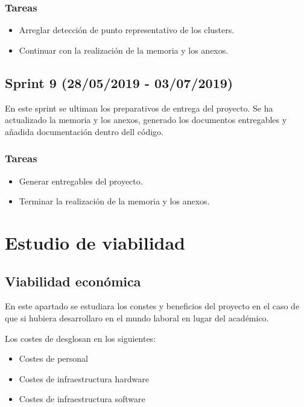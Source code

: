 \subsubsection{Tareas}
\begin{itemize}
\item Arreglar detección de punto representativo de los clusters.
\item Continuar con la realización de la memoria y los anexos.


\end{itemize}


\subsection{Sprint 9 (28/05/2019 - 03/07/2019)}
En este sprint se ultiman los preparativos de entrega del proyecto. Se ha actualizado la memoria y los anexos, generado los documentos entregables y añadida documentación dentro dell código.



\subsubsection{Tareas}
\begin{itemize}
\item Generar entregables del proyecto.
\item Terminar la realización de la memoria y los anexos.


\end{itemize}



\section{Estudio de viabilidad}



\subsection{Viabilidad económica}

En este apartado se estudiara los constes y beneficios del proyecto en el caso de que si hubiera desarrollaro en el mundo laboral en lugar del académico.

Los costes de desglosan en los siguientes: \\
\begin{itemize}
\item Costes de personal
\item Costes de infraestructura hardware
\item Costes de infraestructura software
\end{itemize}

